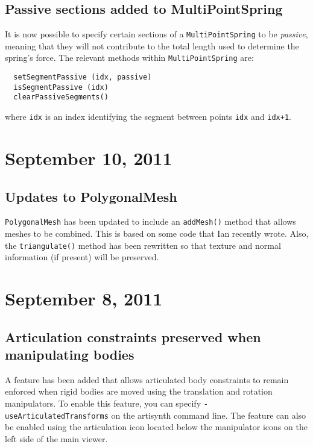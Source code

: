 \documentclass{article}
\begin{document}
\subsection*{Passive sections added to MultiPointSpring}

It is now possible to specify certain sections of a {\tt MultiPointSpring}
to be {\it passive}, meaning that they will not contribute to the total
length used to determine the spring's force. The relevant
methods within {\tt MultiPointSpring} are:

\begin{lstlisting}
  setSegmentPassive (idx, passive)
  isSegmentPassive (idx)
  clearPassiveSegments()
\end{lstlisting}

where {\tt idx} is an index identifying the segment between points
{\tt idx} and {\tt idx+1}.

\section*{September 10, 2011}

\subsection*{Updates to PolygonalMesh}

{\tt PolygonalMesh} has been updated to include an {\tt addMesh()} method that
allows meshes to be combined. This is based on some code that Ian
recently wrote. Also, the {\tt triangulate()} method has been rewritten so
that texture and normal information (if present) will be preserved.

\section*{September 8, 2011}

\subsection*{Articulation constraints preserved when manipulating bodies}

A feature has been added that allows articulated body constraints to
remain enforced when rigid bodies are moved using the translation and
rotation manipulators. To enable this feature, you can specify
{\tt -useArticulatedTransforms} on the artisynth command line.  The
feature can also be enabled using the articulation icon located below
the manipulator icons on the left side of the main viewer.
\end{document}
